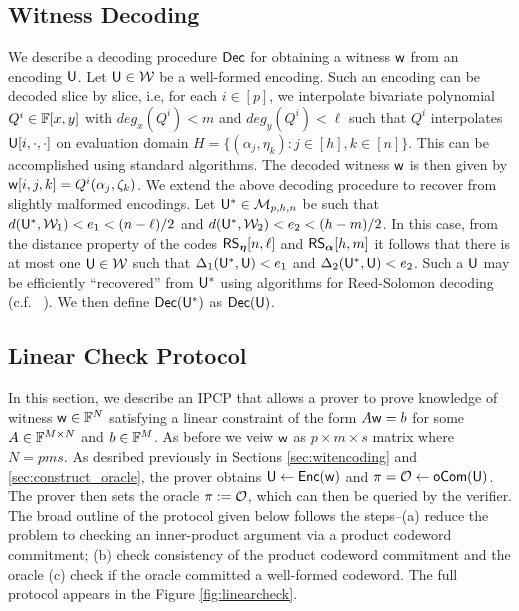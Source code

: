 \subsection{Witness Decoding}\label{sec:witdecoding}
We describe a decoding procedure $\mathsf{Dec}$ for obtaining a witness $\mathsf{w}$ from an encoding
$\mathsf{U}$. Let $\mathsf{U}\in \mathcal{W}$ be a well-formed encoding. Such an encoding can
be decoded slice by slice, i.e, for each $i\in [p]$, we interpolate bivariate
polynomial $Q^i\in \mathbb{F}[x,y]$ with $deg_x(Q^i)<m$ and $deg_y(Q^i)<\ell$ such that
$Q^i$ interpolates $\mathsf{U}[i,\cdot,\cdot]$ on evaluation domain $H=\{(\alpha_j,\eta_k): j\in [h],
k\in [n]\}$. This can be accomplished using
standard algorithms. The decoded witness $\mathsf{w}$ is then given by
$\mathsf{w}[i,j,k]=Q^i(\alpha_j,\zeta_k)$. We extend the above decoding procedure to
recover from slightly malformed encodings. Let $\mathsf{U}^*\in \mathcal{M}_{p,h,n}$ be such
that $d(\mathsf{U}^*,\mathcal{W}_1)<e_1 <(n-\ell)/2 $ and $d(\mathsf{U}^*,\mathcal{W}_2)<e_2
<(h-m)/2$. In this case, from the distance property of the codes $\mathsf{RS}_{\bm{\eta}}[n,\ell]$
and $\mathsf{RS}_{\bm{\alpha}}[h,m]$ it follows that there is at most one $\mathsf{U}\in \mathcal{W}$ such that
$\Delta_1(\mathsf{U}^*,\mathsf{U})<e_1$ and $\Delta_2(\mathsf{U}^*,\mathsf{U})<e_2$. Such a $\mathsf{U}$
may be efficiently ``recovered'' from $\mathsf{U}^*$ using algorithms for Reed-Solomon decoding
(c.f. ~\cite{CodingTheory}). We then define $\mathsf{Dec}(\mathsf{U}^*)$ as $\mathsf{Dec}(\mathsf{U})$.

\subsection{Linear Check Protocol}\label{sec:lincheck}
In this section, we describe an IPCP that allows a prover to prove knowledge of
witness $\mathsf{w}\in \mathbb{F}^N$ satisfying a linear constraint of the form $A\mathsf{w} = b$
for some $A\in \mathbb{F}^{M\times N}$ and $b\in \mathbb{F}^M$. As before we veiw $\mathsf{w}$ as
$p\times m\times s$ matrix where $N=pms$. As desribed previously in Sections
\ref{sec:witencoding} and \ref{sec:construct_oracle}, the prover obtains $\mathsf{U}\gets 
\mathsf{Enc}(\mathsf{w})$ and $\pi=\mathcal{O} \gets \mathsf{oCom}(\mathsf{U})$. The prover then sets the oracle 
$\pi := \mathcal{O}$, which can then be queried by the verifier. The broad
 outline of the protocol given below follows the steps--(a) reduce the problem to checking an inner-product argument via a product codeword commitment; (b) check consistency of the product codeword commitment and the oracle (c) check if the oracle committed a well-formed codeword. The full protocol appears in the
Figure \ref{fig:linearcheck}.\smallskip

